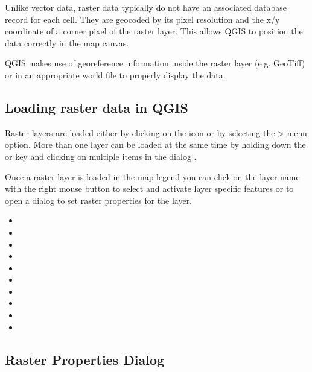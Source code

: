 Unlike vector data, raster data typically do not have an associated database
record for each cell. They are geocoded by its pixel resolution and the x/y 
coordinate of a corner pixel of the raster layer. This allows QGIS to position 
the data correctly in the map canvas. 

QGIS makes use of georeference information inside the raster layer (e.g. GeoTiff) 
or in an appropriate world file to properly display the data.
	
\subsection{Loading raster data in QGIS}\label{label_loadraster}

Raster layers are loaded either by clicking on the 
 icon or by
selecting the > 
menu option. More than one layer can be loaded at the same time by holding down the
 or  key and clicking on multiple items 
in the dialog .

Once a raster layer is loaded in the map legend you can click on the layer name with the 
right mouse button to select and activate layer specific features or to open 
a dialog to set raster properties for the layer.


\begin{itemize}
\item {}
\item {}
\item {}
\item {}
\item {}
\item {}
\item {}
\item {}
\item {}
\item {}
\end{itemize}
	
\subsection{Raster Properties Dialog}\label{label_rasterprop}

